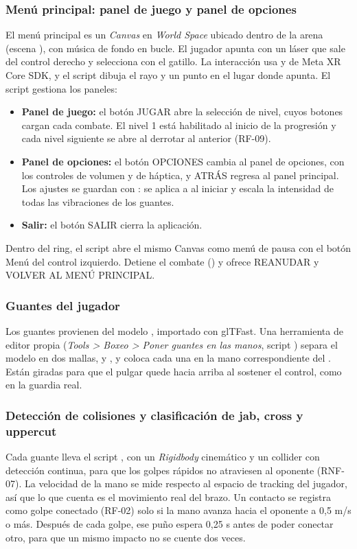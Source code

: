\subsubsection*{Menú principal: panel de juego y panel de opciones}
El menú principal es un \emph{Canvas} en \emph{World Space} ubicado dentro de la arena (escena ), con música de fondo en bucle. El jugador apunta con un láser que sale del control derecho y selecciona con el gatillo. La interacción usa  y  de Meta XR Core SDK, y el script  dibuja el rayo y un punto en el lugar donde apunta. El script  gestiona los paneles:
\begin{itemize}
  \item \textbf{Panel de juego:} el botón JUGAR abre la selección de nivel, cuyos botones cargan cada combate. El nivel 1 está habilitado al inicio de la progresión y cada nivel siguiente se abre al derrotar al anterior (RF-09).
  \item \textbf{Panel de opciones:} el botón OPCIONES cambia al panel de opciones, con los controles de volumen y de háptica, y ATRÁS regresa al panel principal. Los ajustes se guardan con :  se aplica a  al iniciar y  escala la intensidad de todas las vibraciones de los guantes.
  \item \textbf{Salir:} el botón SALIR cierra la aplicación.
\end{itemize}
Dentro del ring, el script  abre el mismo Canvas como menú de pausa con el botón Menú del control izquierdo. Detiene el combate () y ofrece REANUDAR y VOLVER AL MENÚ PRINCIPAL.

\subsubsection*{Guantes del jugador}
Los guantes provienen del modelo , importado con glTFast. Una herramienta de editor propia (\emph{Tools > Boxeo > Poner guantes en las manos}, script ) separa el modelo en dos mallas,  y , y coloca cada una en la mano correspondiente del . Están giradas para que el pulgar quede hacia arriba al sostener el control, como en la guardia real.

\subsubsection*{Detección de colisiones y clasificación de jab, cross y uppercut}
Cada guante lleva el script , con un \emph{Rigidbody} cinemático y un collider con detección continua, para que los golpes rápidos no atraviesen al oponente (RNF-07). La velocidad de la mano se mide respecto al espacio de tracking del jugador, así que lo que cuenta es el movimiento real del brazo. Un contacto se registra como golpe conectado (RF-02) solo si la mano avanza hacia el oponente a 0,5 m/s o más. Después de cada golpe, ese puño espera 0,25 s antes de poder conectar otro, para que un mismo impacto no se cuente dos veces.

